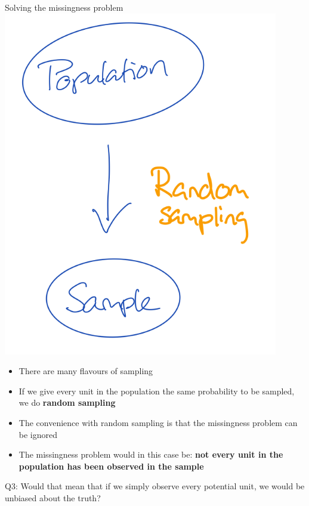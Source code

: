 \documentclass[
  ignorenonframetext,
]{beamer}
\providecommand{\tightlist}{%
  \setlength{\itemsep}{0pt}\setlength{\parskip}{0pt}}\usepackage{longtable,booktabs,array}
\begin{document}
\begin{frame}{Solving the missingness problem}
\protect\hypertarget{solving-the-missingness-problem}{}
\includegraphics[width=0.9\textwidth,height=\textheight]{img/3. random_sampling.png}

\begin{itemize}
\tightlist
\item
  There are many flavours of sampling
\item
  If we give every unit in the population the same probability to be
  sampled, we do \textbf{random sampling}
\item
  The convenience with random sampling is that the missingness problem
  can be ignored
\item
  The missingness problem would in this case be: \textbf{not every unit
  in the population has been observed in the sample}
\end{itemize}

Q3: Would that mean that if we simply observe every potential unit, we
would be unbiased about the truth?
\end{frame}
\end{document}
